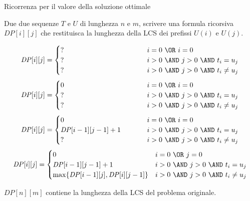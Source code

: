 \begin{frame}{Ricorrenza per il \alert{valore} della soluzione ottimale}

\vspace{-9pt}
\begin{myboxtitle}
Due due sequenze $T$ e $U$ di lunghezza $n$ e $m$, scrivere una formula
ricorsiva $\mathit{DP}[i][j]$ che restituisca la \alert{lunghezza} della LCS dei prefissi $U(i)$ e $U(j)$.
\end{myboxtitle}

\begingroup
\small
\begin{overprint}
\[
  \mathit{DP}[i][j] = \begin{cases}
   \makebox[4cm][l]{?} & i=0\ \OR\ i=0 \\
   \makebox[4cm][l]{?} & i>0\ \AND\ j>0\ \AND\ t_i = u_j \\
   \makebox[4cm][l]{?} & i>0\ \AND\ j>0\ \AND\ t_i \neq u_j
  \end{cases}
\]
\[
  \mathit{DP}[i][j] = \begin{cases}
   0 & i=0\ \OR\ i=0 \\
   \makebox[4cm][l]{?} & i>0\ \AND\ j>0\ \AND\ t_i = u_j \\
   \makebox[4cm][l]{?} & i>0\ \AND\ j>0\ \AND\ t_i \neq u_j
  \end{cases}
\]
\[
  \mathit{DP}[i][j] = \begin{cases}
   0 & i=0\ \OR\ i=0 \\
   \mathit{DP}[i-1][j-1]+1 & i>0\ \AND\ j>0\ \AND\ t_i = u_j \\
   \makebox[4cm][l]{?} & i>0\ \AND\ j>0\ \AND\ t_i \neq u_j
  \end{cases}
\]
\[
  \mathit{DP}[i][j] = \begin{cases}
   0 & i=0\ \OR\ j=0 \\
   \mathit{DP}[i-1][j-1]+1 & i>0\ \AND\ j>0\ \AND\ t_i = u_j \\
   \max \{ \mathit{DP}[i-1][j], \mathit{DP}[i][j-1] \} & i>0\ \AND\ j>0\ \AND\ t_i \neq u_j
  \end{cases}
\]
\end{overprint}
\endgroup

\bigskip
{}

\smallskip
$\mathit{DP}[n][m]$ contiene la lunghezza della LCS del problema originale.

\end{frame}

